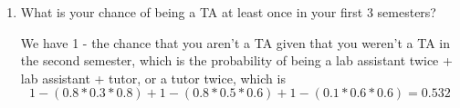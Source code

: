\begin{enumerate}
\item What is your chance of being a TA at least once in your first 3 semesters?
\begin{solution}
We have 1 - the chance that you aren’t a TA given that you weren’t a TA in the second semester, which is the probability of being a lab assistant twice + lab assistant + tutor, or a tutor twice, which is 
\[1- (0.8*0.3*0.8) + 1 - (0.8*0.5*0.6) + 1 - (0.1*0.6*0.6) = 0.532\]
\end{solution}
\end{enumerate}
